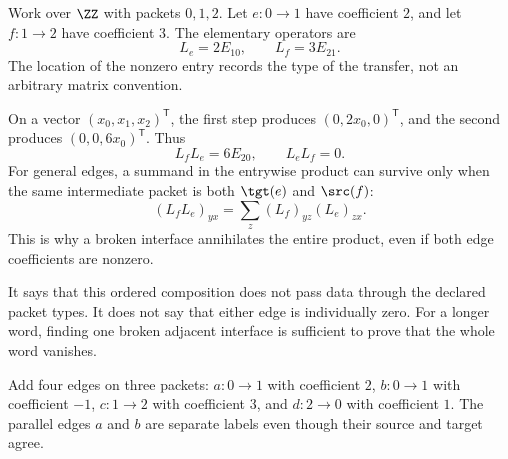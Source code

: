 
Work over $\ZZ$ with packets $0,1,2$. Let $e:0\to1$ have coefficient $2$, and let $f:1\to2$ have coefficient $3$. The elementary operators are
\[
L_e=2E_{10},\qquad L_f=3E_{21}.
\]
The location of the nonzero entry records the type of the transfer, not an arbitrary matrix convention.


On a vector $(x_0,x_1,x_2)^\mathsf T$, the first step produces $(0,2x_0,0)^\mathsf T$, and the second produces $(0,0,6x_0)^\mathsf T$. Thus
\[
L_fL_e=6E_{20},\qquad L_eL_f=0.
\]
For general edges, a summand in the entrywise product can survive only when the same intermediate packet is both $\tgt(e)$ and $\src(f)$:
\[
(L_fL_e)_{yx}=\sum_z(L_f)_{yz}(L_e)_{zx}.
\]
This is why a broken interface annihilates the entire product, even if both edge coefficients are nonzero.

It says that this ordered composition does not pass data through the declared packet types. It does not say that either edge is individually zero. For a longer word, finding one broken adjacent interface is sufficient to prove that the whole word vanishes.


Add four edges on three packets: $a:0\to1$ with coefficient $2$, $b:0\to1$ with coefficient $-1$, $c:1\to2$ with coefficient $3$, and $d:2\to0$ with coefficient $1$. The parallel edges $a$ and $b$ are separate labels even though their source and target agree.


